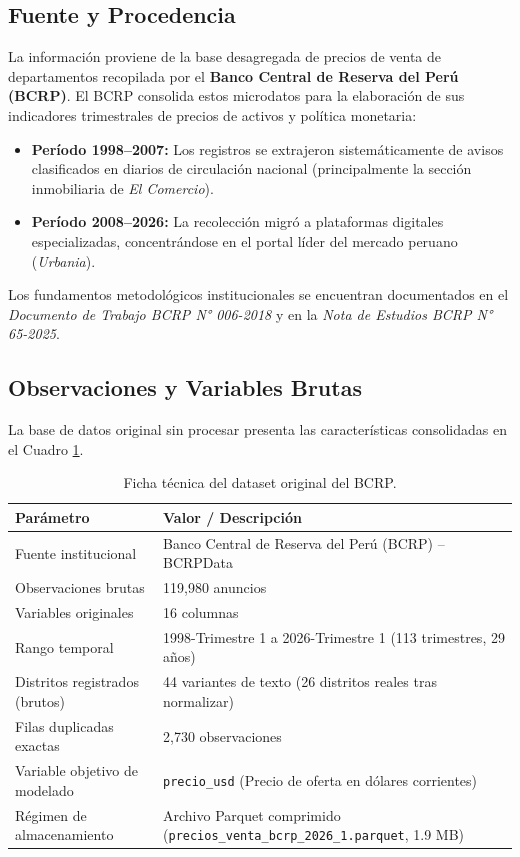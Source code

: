 \documentclass[11pt,a4paper]{article}
\begin{document}
\subsection{Fuente y Procedencia}
La información proviene de la base desagregada de precios de venta de departamentos recopilada por el \textbf{Banco Central de Reserva del Perú (BCRP)}. El BCRP consolida estos microdatos para la elaboración de sus indicadores trimestrales de precios de activos y política monetaria:
\begin{itemize}[leftmargin=1.5cm]
    \item \textbf{Período 1998--2007:} Los registros se extrajeron sistemáticamente de avisos clasificados en diarios de circulación nacional (principalmente la sección inmobiliaria de \textit{El Comercio}).
    \item \textbf{Período 2008--2026:} La recolección migró a plataformas digitales especializadas, concentrándose en el portal líder del mercado peruano (\textit{Urbania}).
\end{itemize}
Los fundamentos metodológicos institucionales se encuentran documentados en el \textit{Documento de Trabajo BCRP N° 006-2018} y en la \textit{Nota de Estudios BCRP N° 65-2025}.

\subsection{Observaciones y Variables Brutas}
La base de datos original sin procesar presenta las características consolidadas en el Cuadro \ref{tab:ficha_tecnica}.

\begin{table}[H]
\centering
\small
\caption{Ficha técnica del dataset original del BCRP.}
\label{tab:ficha_tecnica}
\begin{tabularx}{0.85\textwidth}{lX}
\toprule
\textbf{Parámetro} & \textbf{Valor / Descripción} \\
\midrule
Fuente institucional & Banco Central de Reserva del Perú (BCRP) -- BCRPData \\
Observaciones brutas & 119,980 anuncios \\
Variables originales & 16 columnas \\
Rango temporal & 1998-Trimestre 1 a 2026-Trimestre 1 (113 trimestres, 29 años) \\
Distritos registrados (brutos) & 44 variantes de texto (26 distritos reales tras normalizar) \\
Filas duplicadas exactas & 2,730 observaciones \\
Variable objetivo de modelado & \texttt{precio\_usd} (Precio de oferta en dólares corrientes) \\
Régimen de almacenamiento & Archivo Parquet comprimido (\texttt{precios\_venta\_bcrp\_2026\_1.parquet}, 1.9 MB) \\
\bottomrule
\end{tabularx}
\end{table}
\end{document}
